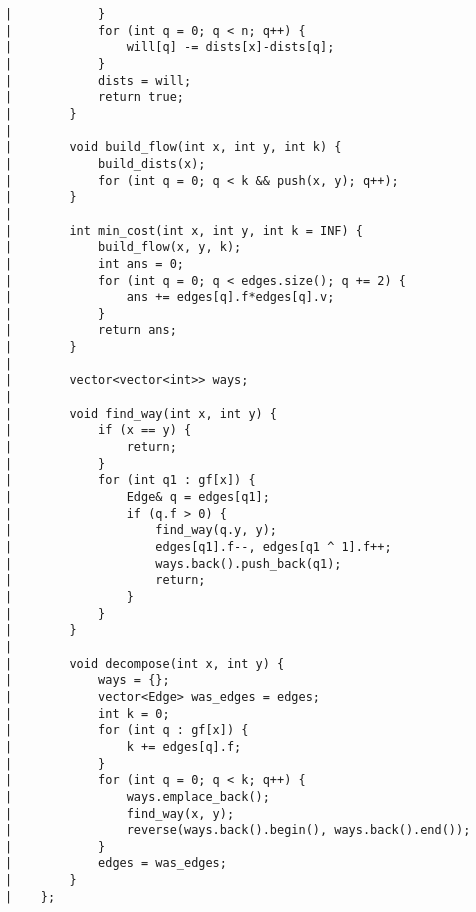 \documentclass[a4paper, 10pt]{article}
\begin{document}
\begin{center}
\begin{verbatim}
|            }
|            for (int q = 0; q < n; q++) {
|                will[q] -= dists[x]-dists[q];
|            }
|            dists = will;
|            return true;
|        }
|    
|        void build_flow(int x, int y, int k) {
|            build_dists(x);
|            for (int q = 0; q < k && push(x, y); q++);
|        }
|    
|        int min_cost(int x, int y, int k = INF) {
|            build_flow(x, y, k);
|            int ans = 0;
|            for (int q = 0; q < edges.size(); q += 2) {
|                ans += edges[q].f*edges[q].v;
|            }
|            return ans;
|        }
|    
|        vector<vector<int>> ways;
|    
|        void find_way(int x, int y) {
|            if (x == y) {
|                return;
|            }
|            for (int q1 : gf[x]) {
|                Edge& q = edges[q1];
|                if (q.f > 0) {
|                    find_way(q.y, y);
|                    edges[q1].f--, edges[q1 ^ 1].f++;
|                    ways.back().push_back(q1);
|                    return;
|                }
|            }
|        }
|    
|        void decompose(int x, int y) {
|            ways = {};
|            vector<Edge> was_edges = edges;
|            int k = 0;
|            for (int q : gf[x]) {
|                k += edges[q].f;
|            }
|            for (int q = 0; q < k; q++) {
|                ways.emplace_back();
|                find_way(x, y);
|                reverse(ways.back().begin(), ways.back().end());
|            }
|            edges = was_edges;
|        }
|    };
\end{verbatim}


\end{center}
\end{document}
